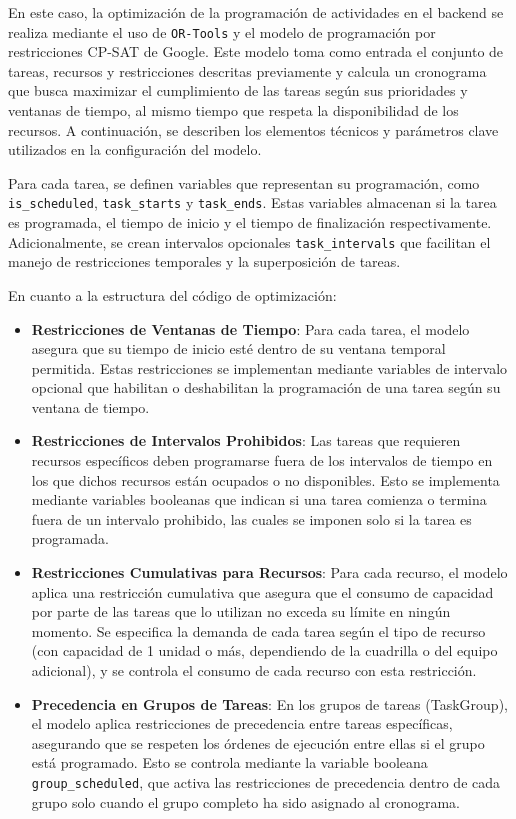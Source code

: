 \documentclass{article}
\begin{document}
En este caso, la optimización de la programación de actividades en el backend se realiza mediante el uso de \texttt{OR-Tools} y el modelo de programación por restricciones CP-SAT de Google. Este modelo toma como entrada el conjunto de tareas, recursos y restricciones descritas previamente y calcula un cronograma que busca maximizar el cumplimiento de las tareas según sus prioridades y ventanas de tiempo, al mismo tiempo que respeta la disponibilidad de los recursos. A continuación, se describen los elementos técnicos y parámetros clave utilizados en la configuración del modelo.

Para cada tarea, se definen variables que representan su programación, como \texttt{is\_scheduled}, \texttt{task\_starts} y \texttt{task\_ends}. Estas variables almacenan si la tarea es programada, el tiempo de inicio y el tiempo de finalización respectivamente. Adicionalmente, se crean intervalos opcionales \texttt{task\_intervals} que facilitan el manejo de restricciones temporales y la superposición de tareas.

En cuanto a la estructura del código de optimización:

\begin{itemize}
    \item \textbf{Restricciones de Ventanas de Tiempo}: Para cada tarea, el modelo asegura que su tiempo de inicio esté dentro de su ventana temporal permitida. Estas restricciones se implementan mediante variables de intervalo opcional que habilitan o deshabilitan la programación de una tarea según su ventana de tiempo.

    \item \textbf{Restricciones de Intervalos Prohibidos}: Las tareas que requieren recursos específicos deben programarse fuera de los intervalos de tiempo en los que dichos recursos están ocupados o no disponibles. Esto se implementa mediante variables booleanas que indican si una tarea comienza o termina fuera de un intervalo prohibido, las cuales se imponen solo si la tarea es programada.

    \item \textbf{Restricciones Cumulativas para Recursos}: Para cada recurso, el modelo aplica una restricción cumulativa que asegura que el consumo de capacidad por parte de las tareas que lo utilizan no exceda su límite en ningún momento. Se especifica la demanda de cada tarea según el tipo de recurso (con capacidad de 1 unidad o más, dependiendo de la cuadrilla o del equipo adicional), y se controla el consumo de cada recurso con esta restricción.

    \item \textbf{Precedencia en Grupos de Tareas}: En los grupos de tareas (TaskGroup), el modelo aplica restricciones de precedencia entre tareas específicas, asegurando que se respeten los órdenes de ejecución entre ellas si el grupo está programado. Esto se controla mediante la variable booleana \texttt{group\_scheduled}, que activa las restricciones de precedencia dentro de cada grupo solo cuando el grupo completo ha sido asignado al cronograma.
\end{itemize}
\end{document}
